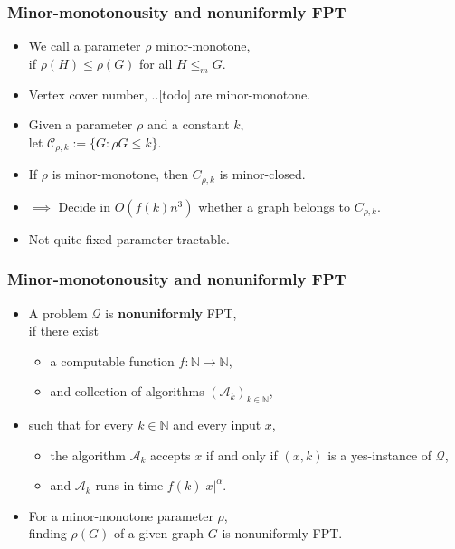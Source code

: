 \documentclass[t,usenames,dvipsnames]{beamer}
\begin{document}
\begin{frame} \frametitle{Minor-monotonousity and nonuniformly FPT}
	\begin{itemize}[<+->]
		\item We call a parameter $\rho$ minor-monotone,\\
			\hspace{1cm}if $\rho(H)\leq \rho(G)$ for all $H \leq_m G$.
		\item Vertex cover number, ..[todo] are minor-monotone.%
		\item Given a parameter $\rho$ and a constant $k$,\\
		\hspace{1cm}let $\mathcal{C}_{\rho, k} := \{G \colon \rho{G} \leq k\}$.
		\item If $\rho$ is minor-monotone, then $C_{\rho, k}$ is minor-closed.
		\item $\implies$ Decide in $O(f(k) n^3)$ whether a graph belongs to $C_{\rho, k}$.
		\item Not quite fixed-parameter tractable.
	\end{itemize}
\end{frame}
\begin{frame} \frametitle{Minor-monotonousity and nonuniformly FPT}
	\begin{itemize}[<+->]
		\item A problem $\mathcal{Q}$ is \textbf{nonuniformly} FPT,\\
			\hspace{1cm}if there exist
			\begin{itemize}
				\item a computable function $f:\mathbb{N}\rightarrow\mathbb{N}$,
				\item and collection of algorithms $(\mathcal{A}_k)_{k \in
					\mathbb{N}}$,
			\end{itemize}
		\item[] such that for every $k \in \mathbb{N}$ and every input $x$, 
		\begin{itemize}[<+->]
			\item the algorithm $\mathcal{A}_k$ accepts $x$ if and only if $(x,
				k)$ is a yes-instance of $\mathcal{Q}$,
			\item and $\mathcal{A}_k$ runs in time $f(k)|x|^{\alpha}$.
		\end{itemize}
	\item For a minor-monotone parameter $\rho$,\\
		\hspace{1cm}finding $\rho(G)$ of a given graph $G$ is nonuniformly FPT.
	\end{itemize}
	
\end{frame}
\end{document}
